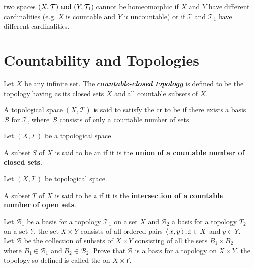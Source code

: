 \documentclass[10pt,a4paper]{report}
\newcommand{\BB}{\mathcal{B}}
\newcommand{\TT}{\mathcal{T}}
\begin{document}
\begin{remark}two spaces $(X,\TT ) \AND (Y, \TT_1 )$ cannot be homeomorphic if $X$ and $Y$ have different cardinalities (e.g. $X$ is countable and $Y$ is uncountable) or if $\TT$ and $\TT_1$ have different cardinalities.
\end{remark}

\section{Countability and Topologies}

\begin{definition} Let $X$ be any infinite set.  The \textbf{\textit{countable-closed topology}} is defined to be the topology having as its closed sets $X$ and all countable subsets of $X$.
\end{definition}

\begin{definition}A topological space $(X, \TT)$ is said to satisfy the  or to be  if there exists a basis $\BB$ for $\TT$, where $\BB$ consists of only a countable number of sets.
\end{definition}

\begin{definition}Let $(X, \TT)$ be a topological space.  \begin{center} A subset $S$ of $X$ is said to be an  if it is the \textbf{union of a countable number of closed sets}.\end{center}
\end{definition}

\begin{definition}Let $(X, \TT)$ be topological space.  \begin{center}A subset $T$ of $X$ is said to be a  if it is the \textbf{intersection of a countable number of open sets}.\end{center}
\end{definition}

\begin{definition}Let $\BB_1$ be a basis for a topology $\TT_1$ on a set $X$ and $\BB_2$ a basis for a topology $T_2$ on a set $Y$.  the set $X \times Y$ consists of all ordered pairs $\left \langle\, x,y \,\right \rangle, x \in X$ and $y \in Y$.  Let $\BB$ be the collection of subsets of $X \times Y$ consisting of all the sets $B_1 \times B_2$ where $B_1 \in \BB_1$ and $B_2 \in \BB_2$.  Prove that $\BB$ is a basis for a topology on $X \times Y$.  the topology so defined is called the  on $X \times Y$.
\end{definition}
\end{document}
